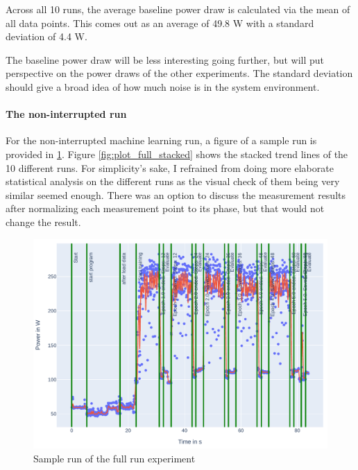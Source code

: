 Across all 10 runs, the average baseline power draw is calculated via the mean of all data points. This comes out as an average of 49.8 W with a standard deviation of 4.4 W.

The baseline power draw will be less interesting going further, but will put perspective on the power draws of the other experiments. The standard deviation should give a broad idea of how much noise is in the system environment.

\paragraph{The non-interrupted run}

For the non-interrupted machine learning run, a figure of a sample run is provided in \ref{fig:plot_full}. 
Figure \ref{fig:plot_full_stacked} shows the stacked trend lines of the 10 different runs.
For simplicity's sake, I refrained from doing more elaborate statistical analysis on the different runs as the visual check of them being very similar seemed enough. 
There was an option to discuss the measurement results after normalizing each measurement point to its phase, but that would not change the result.

\begin{figure}
    \includegraphics[width=\linewidth]{power-measurements/measurements_roberta_full_0714010405/plot.pdf}
    \caption{Sample run of the full run experiment}
    \label{fig:plot_full}
\end{figure}

